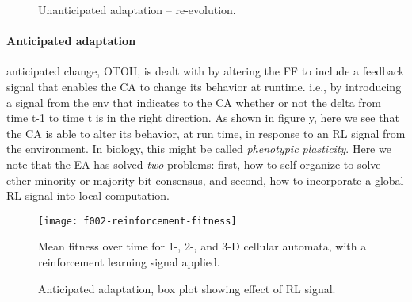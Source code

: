 \begin{figure}
\vspace{10em}
\caption{Unanticipated adaptation -- re-evolution.}
\label{f:scalability}
\end{figure}



\paragraph{Anticipated adaptation}

 anticipated change, OTOH, is dealt with by altering the FF to include a feedback signal that enables the CA to change its behavior at runtime.
 i.e., by introducing a signal from the env that indicates to the CA whether or not the delta from time t-1 to time t is in the right direction.
As shown in figure y, here we see that the CA is able to alter its behavior, at run time, in response to an RL signal from the environment.
In biology, this might be called {\em phenotypic plasticity}.
Here we note that the EA has solved {\em two} problems: first, how to self-organize to solve ether minority or majority bit consensus, and second, how to incorporate a global RL signal into local computation.

\begin{figure}
\centering\texttt{[image: f002-reinforcement-fitness]}
\caption{Mean fitness over time for 1-, 2-, and 3-D cellular automata, with a reinforcement learning signal applied.}
\label{f:003-fitness}
\end{figure}


\begin{figure}
\vspace{10em}
\caption{Anticipated adaptation, box plot showing effect of RL signal.}
\label{f:scalability}
\end{figure}














